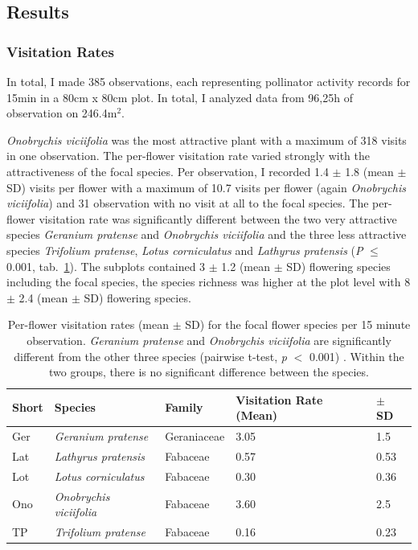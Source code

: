 \label{ch:results_jena}

\subsection{Results}

\subsubsection*{Visitation Rates}			

In total, I made 385 observations, each representing pollinator activity records for 15min in a 80cm x 80cm plot. In total, I analyzed data from 96,25h of observation on 246.4m$^{2}$.

\textit{Onobrychis viciifolia} was the most attractive plant with a maximum of 318 visits in one observation. The per-flower visitation rate varied strongly with the attractiveness of the focal species. Per observation, I recorded 1.4 $\pm$ 1.8 (mean $\pm$ SD) visits per flower with a maximum of 10.7 visits per flower (again \textit{Onobrychis viciifolia}) and 31 observation with no visit at all to the focal species. The per-flower visitation rate was significantly different between the two very attractive species \textit{Geranium pratense} and \textit{Onobrychis viciifolia} and the three less attractive species  \textit{Trifolium pratense}, \textit{Lotus corniculatus} and \textit{Lathyrus pratensis} (\textit{P} $\leq$ 0.001, tab.~\ref{tab:VR_spec}). The subplots contained 3 $\pm$ 1.2 (mean $\pm$ SD) flowering species including the focal species, the species richness was higher at the plot level with 8 $\pm$ 2.4 (mean $\pm$ SD) flowering species.

\begin{table}[!htbp] %
	\centering
	\caption{Per-flower visitation rates (mean $\pm$ SD) for the focal flower species per 15 minute observation. \textit{Geranium pratense} and \textit{Onobrychis viciifolia} are significantly different from the other three species (pairwise t-test, \textit{p} $<$ 0.001) . Within the two groups, there is no significant difference between the species. }
	\begin{tabular}{l l l l l}
		\toprule
		\textbf {Short} & \textbf{Species} & \textbf{Family} &\textbf{Visitation Rate (Mean)} & \textbf{ $\pm$ SD} \\
		\midrule
		Ger  & \textit{Geranium pratense} & Geraniaceae & 3.05 & 1.5 \\ %
		Lat  & \textit{Lathyrus pratensis} & Fabaceae & 0.57 & 0.53 \\ %
		Lot  & \textit{Lotus corniculatus} & Fabaceae & 0.30 & 0.36 \\  %
		Ono  & \textit{Onobrychis viciifolia} & Fabaceae & 3.60  &  2.5 \\ %
		TP   & \textit{Trifolium pratense} & Fabaceae & 0.16 & 0.23 \\ %
		\bottomrule
	\end{tabular}%
	\label{tab:VR_spec}
\end{table}%


